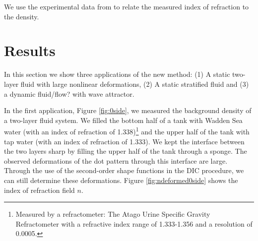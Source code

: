 \documentclass{svjour3}                     %
\begin{document}
We use the experimental data from \cite{tan2015dependence} to relate the measured index of refraction to the density.

\section{Results}
\label{sec:res}
In this section we show three applications of the new method: (1) A static two-layer fluid with large nonlinear deformations, (2) A static stratified fluid and (3) a dynamic fluid/flow? with wave attractor.

In the first application, Figure \ref{fig:0side}, we measured the background density of a two-layer fluid system. We filled the bottom half of a tank with Wadden Sea water (with an index of refraction of 1.338)\footnote{Measured by a refractometer: The Atago Urine Specific Gravity Refractometer with a refractive index range of 1.333-1.356 and a resolution of 0.0005.} and the upper half of the tank with tap water (with an index of refraction of 1.333). We kept the interface between the two layers sharp by filling the upper half of the tank through a sponge. The observed deformations of the dot pattern through this interface are large. Through the use of the second-order shape functions in the DIC procedure, we can still determine these deformations. Figure \ref{fig:ndeformed0side} shows the index of refraction field $n$. %
\end{document}
